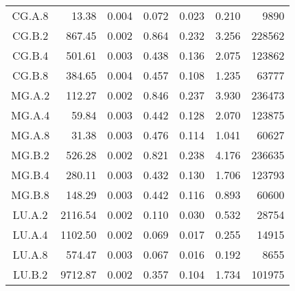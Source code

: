\begin{ThreePartTable}
\begin{longtable}[c]{c*{6}{r}}
        CG.A.8                 & 13.38                               & 0.004                               & 0.072          & 0.023 & 0.210 & 9890   \\
        CG.B.2                 & 867.45                              & 0.002                               & 0.864          & 0.232 & 3.256 & 228562 \\
        CG.B.4                 & 501.61                              & 0.003                               & 0.438          & 0.136 & 2.075 & 123862 \\
        CG.B.8                 & 384.65                              & 0.004                               & 0.457          & 0.108 & 1.235 & 63777  \\
        MG.A.2                 & 112.27                              & 0.002                               & 0.846          & 0.237 & 3.930 & 236473 \\
        MG.A.4                 & 59.84                               & 0.003                               & 0.442          & 0.128 & 2.070 & 123875 \\
        MG.A.8                 & 31.38                               & 0.003                               & 0.476          & 0.114 & 1.041 & 60627  \\
        MG.B.2                 & 526.28                              & 0.002                               & 0.821          & 0.238 & 4.176 & 236635 \\
        MG.B.4                 & 280.11                              & 0.003                               & 0.432          & 0.130 & 1.706 & 123793 \\
        MG.B.8                 & 148.29                              & 0.003                               & 0.442          & 0.116 & 0.893 & 60600  \\
        LU.A.2                 & 2116.54                             & 0.002                               & 0.110          & 0.030 & 0.532 & 28754  \\
        LU.A.4                 & 1102.50                             & 0.002                               & 0.069          & 0.017 & 0.255 & 14915  \\
        LU.A.8                 & 574.47                              & 0.003                               & 0.067          & 0.016 & 0.192 & 8655   \\
        LU.B.2                 & 9712.87                             & 0.002                               & 0.357          & 0.104 & 1.734 & 101975 \\

\end{longtable}
\end{ThreePartTable}
